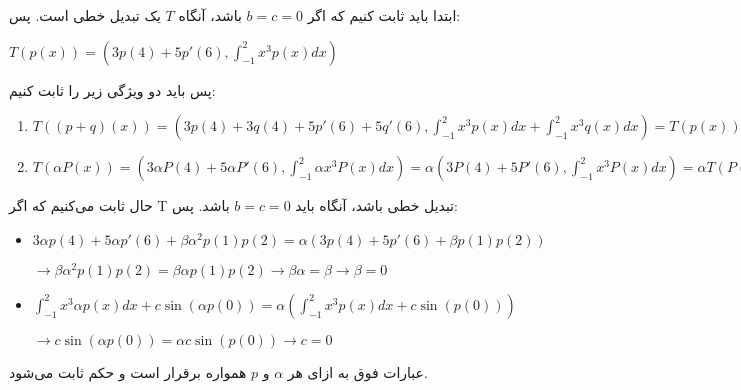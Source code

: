 ابتدا باید ثابت کنیم که اگر $b=c=0$ باشد، آنگاه $T$ یک تبدیل خطی است.
پس:
\setLTR

$T(p(x))=(3p(4)+5p'(6),\int_{-1}^{2}x^3p(x)dx)$

\setRTL

پس باید دو ویژگی زیر را ثابت کنیم:

\setLTR

\begin{enumerate}
	\item $T((p+q)(x))=(3p(4)+3q(4)+5p'(6)+5q'(6),
	\int_{-1}^{2}x^3p(x)dx + \int_{-1}^{2}x^3q(x)dx) = T(p(x))+T(q(x))$
	
	\item $T(\alpha P(x)) = (3\alpha P(4) + 5\alpha P'(6) , \int_{-1}^{2}\alpha x^3P(x)dx)=\alpha(3P(4)+5P'(6),\int_{-1}^{2}x^3P(x)dx)=\alpha T(P(x))$
	\end{enumerate}
	
	\setRTL
	حال ثابت می‌کنیم که اگر T تبدیل خطی باشد، آنگاه باید
	$b=c=0$
	باشد. پس:
	
	\setLTR
	
\begin{itemize}
	\item $3\alpha p(4) + 5\alpha p'(6) + \beta\alpha ^ 2 p(1)p(2) = \alpha (3p(4)+5p'(6)+\beta p(1)p(2))$
	
	$ \longrightarrow \beta\alpha^2p(1)p(2)=\beta\alpha p(1)p(2)\longrightarrow \beta\alpha = \beta \longrightarrow \beta = 0$
	
	\item $\int_{-1}^{2}x^3\alpha p(x)dx + c\sin(\alpha p(0))=\alpha(\int_{-1}^{2}x^3p(x)dx+c\sin(p(0)))$
	
	$\longrightarrow c\sin(\alpha p(0))=\alpha c\sin(p(0))\longrightarrow c = 0$
\end{itemize}

\setRTL

عبارات فوق به ازای هر $\alpha$ و $p$ همواره برقرار است و حکم ثابت می‌شود.







	
	
	
	
	
	
	
	
	
	
	
	